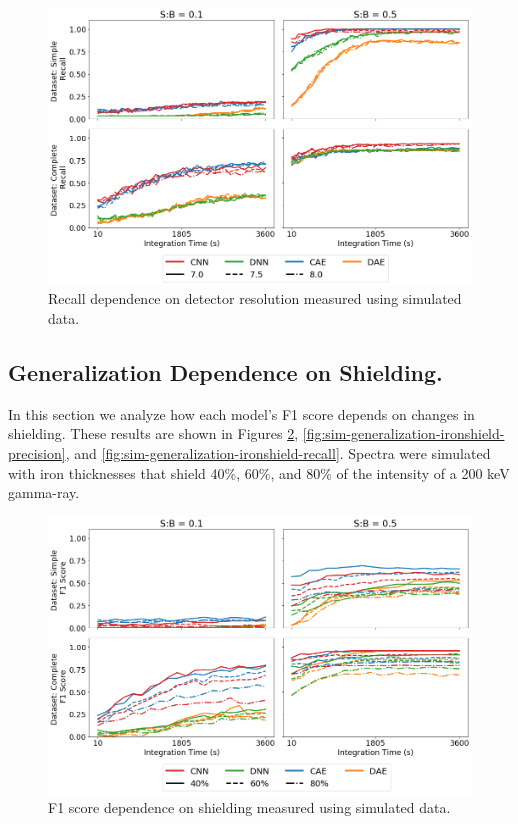 \begin{figure}[H]
	\centering
	\includegraphics[width=1.0\linewidth]{images/sim-generalization-fwhm-recall}
	\caption{Recall dependence on detector resolution measured using simulated data.}
	\label{fig:sim-generalization-fwhm-recall}
\end{figure}


\subsection{Generalization Dependence on Shielding.}

In this section we analyze how each model's F1 score depends on changes in shielding. These results are shown in Figures \ref{fig:sim-generalization-ironshield-f1}, \ref{fig:sim-generalization-ironshield-precision}, and 
\ref{fig:sim-generalization-ironshield-recall}. Spectra were simulated with iron thicknesses that shield 40\%, 60\%, and 80\% of the intensity of a 200 keV gamma-ray.

\begin{figure}[H]
	\centering
	\includegraphics[width=1.0\linewidth]{images/sim-generalization-ironshield-f1}
	\caption{F1 score dependence on shielding measured using simulated data.}
	\label{fig:sim-generalization-ironshield-f1}
\end{figure}

